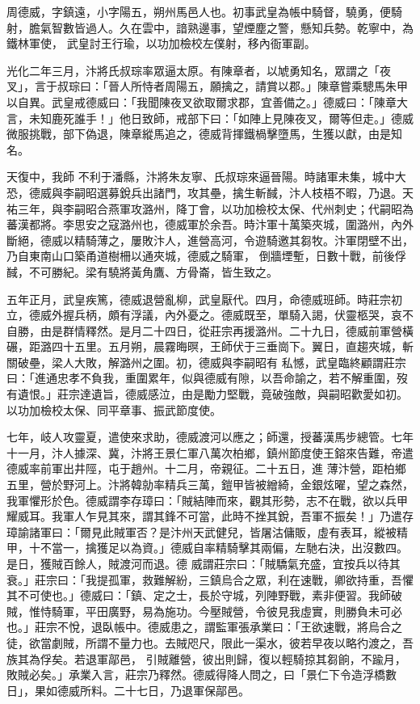 
\begin{pinyinscope}

 周德威，字鎮遠，小字陽五，朔州馬邑人也。初事武皇為帳中騎督，驍勇，便騎射，膽氣智數皆過人。久在雲中，諳熟邊事，望煙塵之警，懸知兵勢。乾寧中，為鐵林軍使，
 武皇討王行瑜，以功加檢校左僕射，移內衙軍副。



 光化二年三月，汴將氏叔琮率眾逼太原。有陳章者，以虓勇知名，眾謂之「夜叉」，言于叔琮曰：「晉人所恃者周陽五，願擒之，請賞以郡。」陳章嘗乘驄馬朱甲以自異。武皇戒德威曰：「我聞陳夜叉欲取爾求郡，宜善備之。」德威曰：「陳章大言，未知鹿死誰手！」他日致師，戒部下曰：「如陣上見陳夜叉，爾等但走。」德威微服挑戰，部下偽退，陳章縱馬追之，德威背揮鐵楇擊墮馬，生獲以獻，由是知名。



 天復中，我師
 不利于潘縣，汴將朱友寧、氏叔琮來逼晉陽。時諸軍未集，城中大恐，德威與李嗣昭選募銳兵出諸門，攻其壘，擒生斬馘，汴人枝梧不暇，乃退。天祐三年，與李嗣昭合燕軍攻潞州，降丁會，以功加檢校太保、代州刺史；代嗣昭為蕃漢都將。李思安之寇潞州也，德威軍於余吾。時汴軍十萬築夾城，圍潞州，內外斷絕，德威以精騎薄之，屢敗汴人，進營高河，令遊騎邀其芻牧。汴軍閉壁不出，乃自東南山口築甬道樹柵以通夾城，德威之騎軍，
 倒牆堙塹，日數十戰，前後俘馘，不可勝紀。梁有驍將黃角鷹、方骨崙，皆生致之。



 五年正月，武皇疾篤，德威退營亂柳，武皇厭代。四月，命德威班師。時莊宗初立，德威外握兵柄，頗有浮議，內外憂之。德威既至，單騎入謁，伏靈柩哭，哀不自勝，由是群情釋然。是月二十四日，從莊宗再援潞州。二十九日，德威前軍營橫碾，距潞四十五里。五月朔，晨霧晦暝，王師伏于三垂崗下。翼日，直趨夾城，斬關破壘，梁人大敗，解潞州之圍。初，德威與李嗣昭有
 私憾，武皇臨終顧謂莊宗曰：「進通忠孝不負我，重圍累年，似與德威有隙，以吾命諭之，若不解重圍，歿有遺恨。」莊宗達遺旨，德威感泣，由是勵力堅戰，竟破強敵，與嗣昭歡愛如初。以功加檢校太保、同平章事、振武節度使。



 七年，岐人攻靈夏，遣使來求助，德威渡河以應之；師還，授蕃漢馬步總管。七年十一月，汴人據深、冀，汴將王景仁軍八萬次柏鄉，鎮州節度使王鎔來告難，帝遣德威率前軍出井陘，屯于趙州。十二月，帝親征。二十五日，進
 薄汴營，距柏鄉五里，營於野河上。汴將韓勍率精兵三萬，鎧甲皆被繒綺，金銀炫曜，望之森然，我軍懼形於色。德威謂李存璋曰：「賊結陣而來，觀其形勢，志不在戰，欲以兵甲耀威耳。我軍人乍見其來，謂其鋒不可當，此時不挫其銳，吾軍不振矣！」乃遣存璋諭諸軍曰：「爾見此賊軍否？是汴州天武健兒，皆屠沽傭販，虛有表耳，縱被精甲，十不當一，擒獲足以為資。」德威自率精騎擊其兩偏，左馳右決，出沒數四。是日，獲賊百餘人，賊渡河而退。德
 威謂莊宗曰：「賊驕氣充盛，宜按兵以待其衰。」莊宗曰：「我提孤軍，救難解紛，三鎮烏合之眾，利在速戰，卿欲持重，吾懼其不可使也。」德威曰：「鎮、定之士，長於守城，列陣野戰，素非便習。我師破賊，惟恃騎軍，平田廣野，易為施功。今壓賊營，令彼見我虛實，則勝負未可必也。」莊宗不悅，退臥帳中。德威患之，謂監軍張承業曰：「王欲速戰，將烏合之徒，欲當劇賊，所謂不量力也。去賊咫尺，限此一渠水，彼若早夜以略彴渡之，吾族其為俘矣。若退軍鄗邑，
 引賊離營，彼出則歸，復以輕騎掠其芻餉，不踰月，敗賊必矣。」承業入言，莊宗乃釋然。德威得降人問之，曰「景仁下令造浮橋數日」，果如德威所料。二十七日，乃退軍保鄗邑。




\end{pinyinscope}
